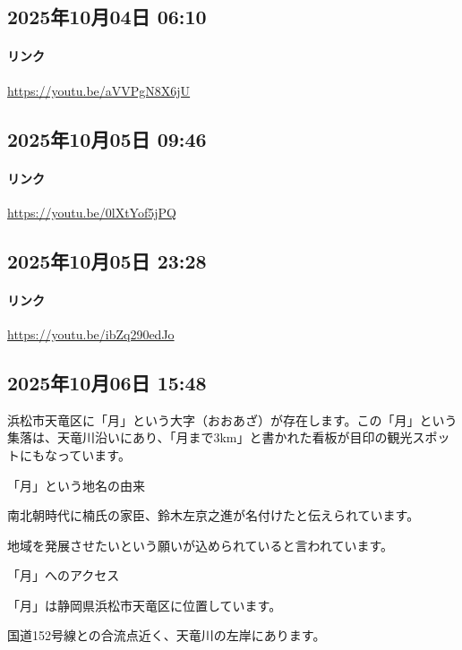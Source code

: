 \subsection*{2025年10月04日 06:10}

\paragraph{リンク}
\url{https://youtu.be/aVVPgN8X6jU}

\subsection*{2025年10月05日 09:46}

\paragraph{リンク}
\url{https://youtu.be/0lXtYof5jPQ}

\subsection*{2025年10月05日 23:28}

\paragraph{リンク}
\url{https://youtu.be/ibZq290edJo}

\subsection*{2025年10月06日 15:48}

浜松市天竜区に「月」という大字（おおあざ）が存在します。この「月」という集落は、天竜川沿いにあり、「月まで3km」と書かれた看板が目印の観光スポットにもなっています。﻿

「月」という地名の由来﻿

南北朝時代に楠氏の家臣、鈴木左京之進が名付けたと伝えられています。

地域を発展させたいという願いが込められていると言われています。

「月」へのアクセス

「月」は静岡県浜松市天竜区に位置しています。﻿

国道152号線との合流点近く、天竜川の左岸にあります。﻿

